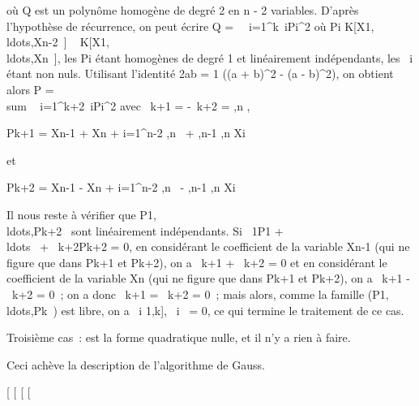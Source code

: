 où Q est un polynôme homogène de degré 2 en n - 2 variables. D'après
l'hypothèse de récurrence, on peut écrire Q =\
\sum ~
i=1^k\alpha~iPi^2 où Pi \in
K{[}X1,\\ldots,Xn-2~{]}
\subset~
K{[}X1,\\ldots,Xn~{]},
les Pi étant homogènes de degré 1 et linéairement
indépendants, les \alpha~i étant non nuls. Utilisant l'identité 2ab
= 1 \over 2 \left ((a +
b)^2 - (a - b)^2\right ), on obtient
alors P = \\sum ~
i=1^k+2\alpha~iPi^2 avec
\alpha~k+1 = -\alpha~k+2 = ,n
 ,

Pk+1 = Xn-1 + Xn +
\sum i=1^n-2 \omegai,n~ +
\omegai,n-1 \over {},n Xi

et

Pk+2 = Xn-1 - Xn +
\sum i=1^n-2 \omegai,n~ -
\omegai,n-1 \over {},n Xi

Il nous reste à vérifier que
P1,\\ldots,Pk+2~
sont linéairement indépendants. Si \lambda~1P1 +
\\ldots~ +
\lambda~k+2Pk+2 = 0, en considérant le coefficient de la
variable Xn-1 (qui ne figure que dans Pk+1 et
Pk+2), on a \lambda~k+1 + \lambda~k+2 = 0 et en
considérant le coefficient de la variable Xn (qui ne figure
que dans Pk+1 et Pk+2), on a \lambda~k+1 -
\lambda~k+2 = 0~; on a donc \lambda~k+1 = \lambda~k+2 = 0~;
mais alors, comme la famille
(P1,\\ldots,Pk~)
est libre, on a \forall~i \in {[}1,k{]}, \lambda~i~ =
0, ce qui termine le traitement de ce cas.

Troisième cas~: \Phi est la forme quadratique nulle, et il n'y a rien à
faire.

Ceci achève la description de l'algorithme de Gauss.

{[}
{[}
{[}
{[}

